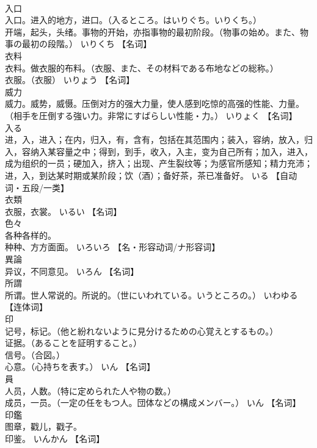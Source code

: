 \documentclass[8pt]{extreport}
\begin{document}
\begin{CJK}{UTF8}{min}
\\	入口	
\\	入口。进入的地方，进口。（入るところ。はいりぐち。いりくち。） 
\\	开端，起头，头绪。事物的开始，亦指事物的最初阶段。（物事の始め。また、物事の最初の段階。）	いりくち		【名词】
\\	衣料	
\\	衣料。做衣服的布料。（衣服、また、その材料である布地などの総称。） 
\\	衣服。（衣服）	いりょう		【名词】
\\	威力	
\\	威力。威势，威慑。压倒对方的强大力量，使人感到吃惊的高强的性能、力量。（相手を圧倒する強い力。非常にすばらしい性能・力。）	いりょく		【名词】
\\	入る	
\\	进，入，进入；在内，归入，有，含有，包括在其范围内；装入，容纳，放入，归入，容纳入某容量之中；得到，到手，收入，入主，变为自己所有；加入，进入，成为组织的一员；硬加入，挤入；出现、产生裂纹等；为感官所感知；精力充沛；进，入，到达某时期或某阶段；饮（酒）；备好茶，茶已准备好。	いる		【自动词・五段/一类】
\\	衣類	
\\	衣服，衣裳。	いるい		【名词】
\\	色々	
\\	各种各样的。 
\\	种种、方方面面。	いろいろ		【名・形容动词/ナ形容词】
\\	異論	
\\	异议，不同意见。	いろん		【名词】
\\	所謂	
\\	所谓。世人常说的。所说的。（世にいわれている。いうところの。）	いわゆる		【连体词】
\\	印	
\\	记号，标记。（他と紛れないように見分けるための心覚えとするもの。） 
\\	证据。（あることを証明すること。） 
\\	信号。（合図。） 
\\	心意。（心持ちを表す。）	いん		【名词】
\\	員	
\\	人员，人数。（特に定められた人や物の数。） 
\\	成员，一员。（一定の任をもつ人。団体などの構成メンバー。）	いん		【名词】
\\	印鑑	
\\	图章，戳儿，戳子。 
\\	印鉴。	いんかん		【名词】

\end{CJK}
\end{document}
